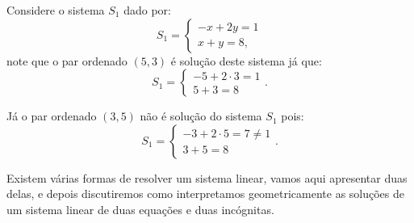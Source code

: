 \begin{exem}
 Considere o sistema $S_1$ dado por:
 \[S_1= \begin{cases}
      -x + 2y= 1 \\
      x + y= 8,
     \end{cases}\]
 note que o par ordenado $(5, 3)$ é solução deste sistema já que:
 \[S_1= \begin{cases}
      -5 + 2 \cdot 3= 1 \\
      5 + 3= 8
     \end{cases} .\]

Já o par ordenado $(3, 5)$ não é solução do sistema $S_1$ pois:
\[S_1= \begin{cases}
      -3 + 2 \cdot 5= 7 \neq 1 \\
      3 + 5= 8
     \end{cases} .\]
\end{exem}

Existem várias formas de resolver um sistema linear, vamos aqui apresentar duas delas, e depois discutiremos como interpretamos geometricamente as soluções de um sistema linear de duas equações e duas incógnitas.

